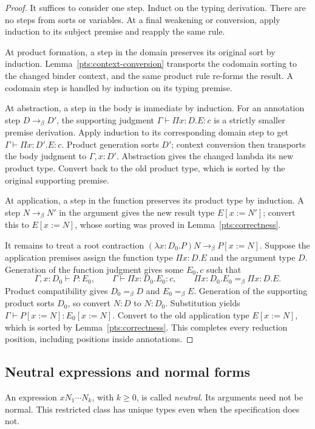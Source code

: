 \begin{proof}
It suffices to consider one step. Induct on the typing derivation.
There are no steps from sorts or variables. At a final weakening or
conversion, apply induction to its subject premise and reapply the
same rule.

At product formation, a step in the domain preserves its original sort
by induction. Lemma~\ref{pts:context-conversion} transports the codomain
sorting to the changed binder context, and the same product rule
re-forms the result. A codomain step is handled by induction on its
typing premise.

At abstraction, a step in the body is immediate by induction. For an
annotation step $D\to_\beta D'$, the supporting judgment
$\Gamma\vdash\Pi x:D.E:c$ is a strictly smaller premise derivation.
Apply induction to its corresponding domain step to get
$\Gamma\vdash\Pi x:D'.E:c$. Product generation sorts $D'$;
context conversion then transports the body judgment to
$\Gamma,x:D'$. Abstraction gives the changed lambda its new product
type. Convert back to the old product type, which is sorted by the
original supporting premise.

At application, a step in the function preserves its product type by
induction. A step $N\to_\beta N'$ in the argument gives the new
result type $E[x:=N']$; convert this to $E[x:=N]$, whose sorting was
proved in Lemma~\ref{pts:correctness}.

It remains to treat a root contraction
$(\lambda x:D_0.P)N\to_\beta P[x:=N]$. Suppose the application
premises assign the function type $\Pi x:D.E$ and the argument
type $D$. Generation of the function judgment gives some $E_0,c$
such that
\[
 \Gamma,x:D_0\vdash P:E_0,
 \qquad\Gamma\vdash\Pi x:D_0.E_0:c,
 \qquad\Pi x:D_0.E_0=_\beta\Pi x:D.E.
\]
Product compatibility gives $D_0=_\beta D$ and $E_0=_\beta E$.
Generation of the supporting product sorts $D_0$, so convert
$N:D$ to $N:D_0$. Substitution yields
$\Gamma\vdash P[x:=N]:E_0[x:=N]$.
Convert to the old application type $E[x:=N]$, which is sorted by
Lemma~\ref{pts:correctness}. This completes every reduction position,
including positions inside annotations.
\end{proof}

\subsection{Neutral expressions and normal forms}
\label{pts:neutrals}

An expression $xN_1\cdots N_k$, with $k\geq0$, is called
\emph{neutral}. Its arguments need not be normal. This restricted
class has unique types even when the specification does not.

